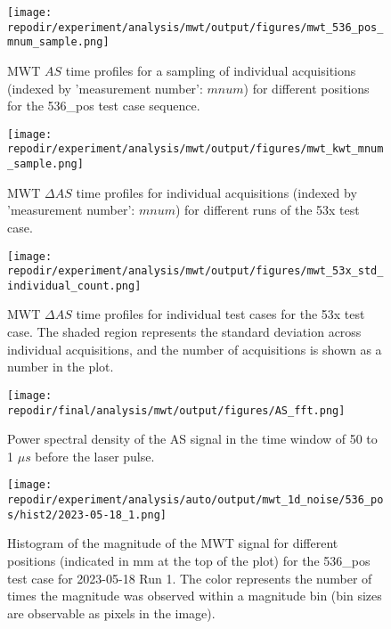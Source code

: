 \begin{figure}[]
\centering
\texttt{[image: \\repodir/experiment/analysis/mwt/output/figures/mwt\_536\_pos\_mnum\_sample.png]}
\caption{MWT $AS$ time profiles for a sampling of individual acquisitions (indexed by 'measurement number': $mnum$) for different positions for the 536\_pos test case sequence.}
\label{fig:SI_mwt_536_pos_mnum_sample}
\end{figure}

\begin{figure}
    \centering
    \texttt{[image: \\repodir/experiment/analysis/mwt/output/figures/mwt\_kwt\_mnum\_sample.png]} 
    \caption{MWT $\Delta AS$ time profiles for individual acquisitions (indexed by 'measurement number': $mnum$) for different runs of the 53x test case.  }
    \label{fig:SI_mwt_kwt_mnum_sample}
\end{figure}

\begin{figure}
    \centering
    \texttt{[image: \\repodir/experiment/analysis/mwt/output/figures/mwt\_53x\_std\_individual\_count.png]} 
    \caption{MWT $\Delta AS$ time profiles for individual test cases for the 53x test case. The shaded region represents the standard deviation across individual acquisitions, and the number of acquisitions is shown as a number in the plot.}
    \label{fig:SI_mwt_53x_std_individual_count}
\end{figure}

\begin{figure}
    \centering
    \texttt{[image: \\repodir/final/analysis/mwt/output/figures/AS\_fft.png]} 
    \caption{Power spectral density of the AS signal in the time window of 50 to 1 $\mu s$ before the laser pulse.}
    \label{fig:SI_AS_fft}
\end{figure}

\begin{figure}
    \centering
    \texttt{[image: \\repodir/experiment/analysis/auto/output/mwt\_1d\_noise/536\_pos/hist2/2023-05-18\_1.png]} 
    \caption{Histogram of the magnitude of the MWT signal for different positions (indicated in mm at the top of the plot) for the 536\_pos test case for 2023-05-18 Run 1. The color represents the number of times the magnitude was observed within a magnitude bin (bin sizes are observable as pixels in the image). }
    \label{fig:SI_mwt_1d_noise_536_pos_hist2_2023-05-18_1}
\end{figure}

